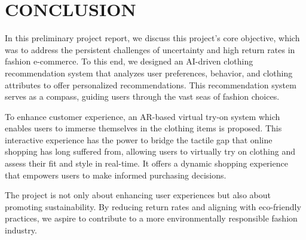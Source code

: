 \chapter{CONCLUSION}

In this preliminary project report, we discuss this project's core objective, which was to address the persistent challenges of uncertainty and high return rates in fashion e-commerce. To this end, we designed an AI-driven clothing recommendation system that analyzes user preferences, behavior, and clothing attributes to offer personalized recommendations. This recommendation system serves as a compass, guiding users through the vast seas of fashion choices.

To enhance customer experience, an AR-based virtual try-on system which enables users to immerse themselves in the clothing items is proposed. This interactive experience has the power to bridge the tactile gap that online shopping has long suffered from, allowing users to virtually try on clothing and assess their fit and style in real-time. It offers a dynamic shopping experience that empowers users to make informed purchasing decisions.

The project is not only about enhancing user experiences but also about promoting sustainability. By reducing return rates and aligning with eco-friendly practices, we aspire to contribute to a more environmentally responsible fashion industry.